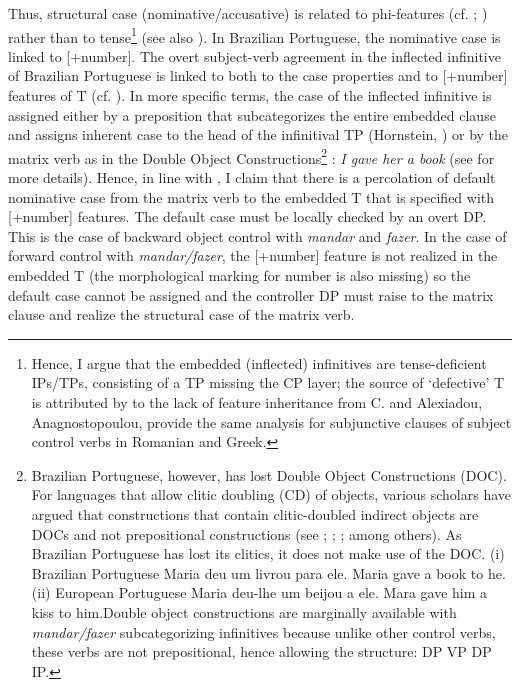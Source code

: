\documentclass[output=paper]{langsci/langscibook}
\begin{document}
Thus, structural case (nominative/accusative) is related to phi-features (cf. \citealt{George1981}; \citealt{Sitaridou2006}) rather than to tense\footnote{Hence, I argue that the embedded (inflected) infinitives are tense-deficient IPs/TPs, consisting of a TP missing the CP layer; the source of ‘defective’ T is attributed by \citet{Chomsky2008} to the lack of feature inheritance from C. \citet{Alboiu2007} and Alexiadou, Anagnostopoulou, \citet{Iordachioaia2010} provide the same analysis for subjunctive clauses of subject control verbs in Romanian and Greek.} (see also \citealt{Pires2010}). In Brazilian Portuguese, the nominative case is linked to [+number]. The overt subject-verb agreement in the inflected infinitive of Brazilian Portuguese is linked to both to the case properties and to [+number] features of T (cf. \citealt{Nunes1998}). In more specific terms, the case of the inflected infinitive is assigned either by a preposition that subcategorizes the entire embedded clause and assigns inherent case to the head of the infinitival TP (Hornstein, \citet{Martins2008}) or by the matrix verb as in the Double Object Constructions\footnote{Brazilian Portuguese, however, has lost Double Object Constructions (DOC). For languages that allow clitic doubling (CD) of objects, various scholars have argued that constructions that contain clitic-doubled indirect objects are DOCs and not prepositional constructions (see \citealt{Demonte1995}; \citealt{Bleam1999}; \citealt{Anagnostopoulou2003}; among others). As Brazilian Portuguese has lost its clitics, it does not make use of the DOC. (i)  Brazilian Portuguese Maria deu   um livrou para ele.            Maria gave a     book  to      he.(ii)  European Portuguese  Maria deu-lhe   um beijou a  ele.            Mara  gave him a    kiss    to him.Double object constructions are marginally available with \textit{mandar/fazer} subcategorizing infinitives because unlike other control verbs, these verbs are not prepositional, hence allowing the structure: DP VP DP IP.} : \textit{I gave her a book} (see \citealt{Larson1991} for more details). Hence, in line with \citet{Raposo1987}, I claim that there is a percolation of default nominative case from the matrix verb to the embedded T that is specified with [+number] features. The default case must be locally checked by an overt DP. This is the case of backward object control with \textit{mandar} and \textit{fazer}. In the case of forward control with \textit{mandar/fazer}, the [+number] feature is not realized in the embedded T (the morphological marking for number is also missing) so the default case cannot be assigned and the controller DP must raise to the matrix clause and realize the structural case of the matrix verb.
\end{document}
